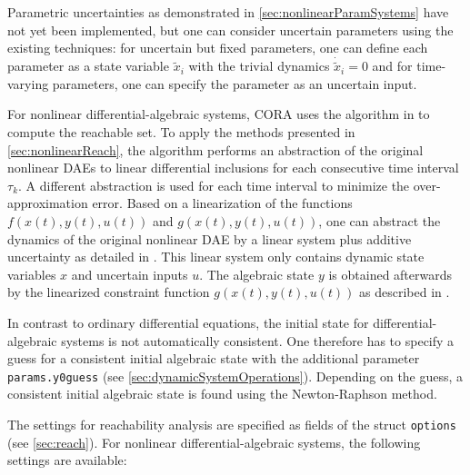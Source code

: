 Parametric uncertainties as demonstrated in \cref{sec:nonlinearParamSystems} have not yet been implemented, but one can consider uncertain parameters using the existing techniques: for uncertain but fixed parameters, one can define each parameter as a state variable $\tilde{x}_i$ with the trivial dynamics $\dot{\tilde{x}}_i = 0$ and for time-varying parameters, one can specify the parameter as an uncertain input.



\label{sec:reachDAEsys}

For nonlinear differential-algebraic systems, CORA uses the algorithm in \cite{Althoff2014a} to compute the reachable set. To apply the methods presented in \cref{sec:nonlinearReach}, the algorithm performs an abstraction of the original nonlinear DAEs to linear differential inclusions for each consecutive time interval $\tau_k$. A different abstraction is used for each time interval to minimize the over-approximation error. Based on a linearization of the functions $f(x(t),y(t),u(t))$ and $g(x(t),y(t),u(t))$, one can abstract the dynamics of the original nonlinear DAE by a linear system plus additive uncertainty as detailed in \cite[Section IV]{Althoff2014a}. This linear system only contains dynamic state variables $x$ and uncertain inputs $u$. The algebraic state $y$ is obtained afterwards by the linearized constraint function $g(x(t),y(t),u(t))$ as described in \cite[Proposition 2]{Althoff2014a}.

In contrast to ordinary differential equations, the initial state for differential-algebraic systems is not automatically consistent. One therefore has to specify a guess for a consistent initial algebraic state with the additional parameter \texttt{params.y0guess} (see \cref{sec:dynamicSystemOperations}). Depending on the guess, a consistent initial algebraic state is found using the Newton-Raphson method.

The settings for reachability analysis are specified as fields of the struct \texttt{options} (see \cref{sec:reach}). For nonlinear differential-algebraic systems, the following settings are available:

